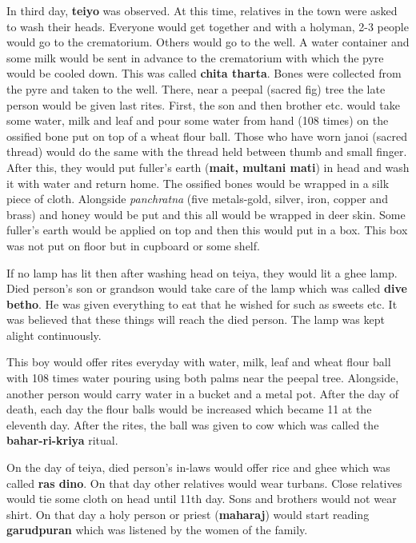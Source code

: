 In third day, \textbf{teiyo} was observed. At this time, relatives in the town
were asked to wash their heads. Everyone would get together and with a
holyman, 2-3 people would go to the crematorium. Others would go to
the well. A water container and some milk would be sent in advance to the
crematorium with which the pyre would be cooled down. This was called
\textbf{chita tharta}. Bones were collected from the pyre and taken to the
well. There, near a peepal (sacred fig) tree the late person would be given
last rites. First, the son and then brother etc. would take some water, milk and
leaf and pour some water from hand (108 times) on the ossified bone put on top
of a wheat flour ball. Those who have worn janoi (sacred thread) would do the
same with the thread held between thumb and small finger. After this, they
would put fuller's earth (\textbf{mait, multani mati}) in head and wash it with
water and return home. The ossified bones would be wrapped in a silk piece of
cloth. Alongside \textit{panchratna} (five metals-gold, silver, iron, copper and
brass) and honey would be put and this all would be wrapped in deer skin. Some
fuller's earth would be applied on top and then this would put in a box. This
box was not put on floor but in cupboard or some shelf.

If no lamp has lit then after washing head on teiya, they would lit a ghee
lamp. Died person's son or grandson would take care of the lamp which was
called \textbf{dive betho}. He was given everything to eat that he wished for
such as sweets etc. It was believed that these things will reach the died
person. The lamp was kept alight continuously. 

This boy would offer rites everyday with water, milk, leaf and wheat flour ball
with 108 times water pouring using both palms near the peepal tree. Alongside,
another person would carry water in a bucket and a metal pot. After the day of
death, each day the flour balls would be increased which became 11 at the
eleventh day. After the rites, the ball was given to cow which was called the
\textbf{bahar-ri-kriya} ritual.

On the day of teiya, died person's in-laws would offer rice and ghee which was
called \textbf{ras dino}. On that day other relatives would wear turbans. Close
relatives would tie some cloth on head until 11th day. Sons and brothers would
not wear shirt. On that day a holy person or priest (\textbf{maharaj}) would
start reading \textbf{garudpuran} which was listened by the women of the
family. 

